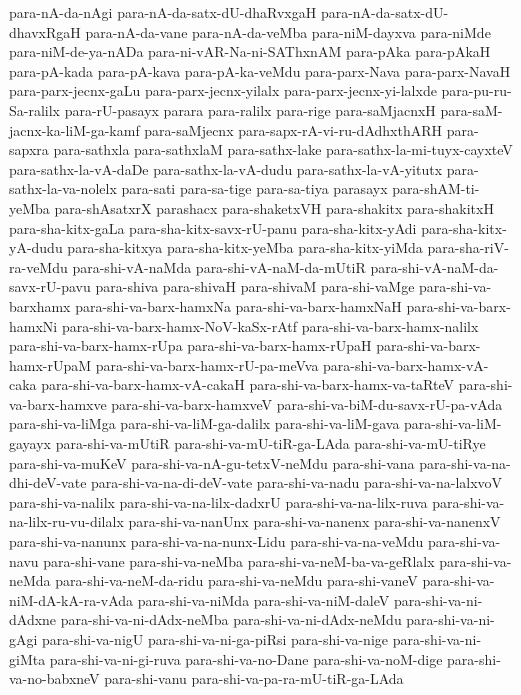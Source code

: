 {para-nA-da-nAgi
para-nA-da-satx-dU-dhaRvxgaH
para-nA-da-satx-dU-dhavxRgaH
para-nA-da-vane
para-nA-da-veMba
para-niM-dayxva
para-niMde
para-niM-de-ya-nADa
para-ni-vAR-Na-ni-SAThxnAM
para-pAka
para-pAkaH
para-pA-kada
para-pA-kava
para-pA-ka-veMdu
para-parx-Nava
para-parx-NavaH
para-parx-jecnx-gaLu
para-parx-jecnx-yilalx
para-parx-jecnx-yi-lalxde
para-pu-ru-Sa-ralilx
para-rU-pasayx
parara
para-ralilx
para-rige
para-saMjacnxH
para-saM-jacnx-ka-liM-ga-kamf
para-saMjecnx
para-sapx-rA-vi-ru-dAdhxthARH
para-sapxra
para-sathxla
para-sathxlaM
para-sathx-lake
para-sathx-la-mi-tuyx-cayxteV
para-sathx-la-vA-daDe
para-sathx-la-vA-dudu
para-sathx-la-vA-yitutx
para-sathx-la-va-nolelx
para-sati
para-sa-tige
para-sa-tiya
parasayx
para-shAM-ti-yeMba
para-shAsatxrX
parashacx
para-shaketxVH
para-shakitx
para-shakitxH
para-sha-kitx-gaLa
para-sha-kitx-savx-rU-panu
para-sha-kitx-yAdi
para-sha-kitx-yA-dudu
para-sha-kitxya
para-sha-kitx-yeMba
para-sha-kitx-yiMda
para-sha-riV-ra-veMdu
para-shi-vA-naMda
para-shi-vA-naM-da-mUtiR
para-shi-vA-naM-da-savx-rU-pavu
para-shiva
para-shivaH
para-shivaM
para-shi-vaMge
para-shi-va-barxhamx
para-shi-va-barx-hamxNa
para-shi-va-barx-hamxNaH
para-shi-va-barx-hamxNi
para-shi-va-barx-hamx-NoV-kaSx-rAtf
para-shi-va-barx-hamx-nalilx
para-shi-va-barx-hamx-rUpa
para-shi-va-barx-hamx-rUpaH
para-shi-va-barx-hamx-rUpaM
para-shi-va-barx-hamx-rU-pa-meVva
para-shi-va-barx-hamx-vA-caka
para-shi-va-barx-hamx-vA-cakaH
para-shi-va-barx-hamx-va-taRteV
para-shi-va-barx-hamxve
para-shi-va-barx-hamxveV
para-shi-va-biM-du-savx-rU-pa-vAda
para-shi-va-liMga
para-shi-va-liM-ga-dalilx
para-shi-va-liM-gava
para-shi-va-liM-gayayx
para-shi-va-mUtiR
para-shi-va-mU-tiR-ga-LAda
para-shi-va-mU-tiRye
para-shi-va-muKeV
para-shi-va-nA-gu-tetxV-neMdu
para-shi-vana
para-shi-va-na-dhi-deV-vate
para-shi-va-na-di-deV-vate
para-shi-va-nadu
para-shi-va-na-lalxvoV
para-shi-va-nalilx
para-shi-va-na-lilx-dadxrU
para-shi-va-na-lilx-ruva
para-shi-va-na-lilx-ru-vu-dilalx
para-shi-va-nanUnx
para-shi-va-nanenx
para-shi-va-nanenxV
para-shi-va-nanunx
para-shi-va-na-nunx-Lidu
para-shi-va-na-veMdu
para-shi-va-navu
para-shi-vane
para-shi-va-neMba
para-shi-va-neM-ba-va-geRlalx
para-shi-va-neMda
para-shi-va-neM-da-ridu
para-shi-va-neMdu
para-shi-vaneV
para-shi-va-niM-dA-kA-ra-vAda
para-shi-va-niMda
para-shi-va-niM-daleV
para-shi-va-ni-dAdxne
para-shi-va-ni-dAdx-neMba
para-shi-va-ni-dAdx-neMdu
para-shi-va-ni-gAgi
para-shi-va-nigU
para-shi-va-ni-ga-piRsi
para-shi-va-nige
para-shi-va-ni-giMta
para-shi-va-ni-gi-ruva
para-shi-va-no-Dane
para-shi-va-noM-dige
para-shi-va-no-babxneV
para-shi-vanu
para-shi-va-pa-ra-mU-tiR-ga-LAda
}
